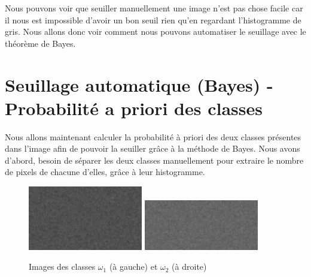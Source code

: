 \documentclass[a4paper,11pt]{article}
\begin{document}
  
  Nous pouvons voir que seuiller manuellement une image n'est pas chose facile car il nous
  est impossible d'avoir un bon seuil rien qu'en regardant l'histogramme de gris.
  Nous allons donc voir comment nous pouvons automatiser le seuillage avec le théorème
  de Bayes.
  
  \section{Seuillage automatique (Bayes) - Probabilité a priori des classes}
  Nous allons maintenant calculer la probabilité à priori des deux classes présentes dans l'image
  afin de pouvoir la seuiller grâce à la méthode de Bayes. Nous avons d'abord, besoin de séparer
  les deux classes manuellement pour extraire le nombre de pixels de chacune d'elles, grâce à leur 
  histogramme.\\
  
  \begin{figure}[H]
    \center
    \includegraphics[width=5cm]{2classes_100_100_8bits_omega1.png}
    \includegraphics[width=5cm]{2classes_100_100_8bits_omega2.png}
    \caption{Images des classes $\omega_{1}$ (à gauche) et $\omega_{2}$ (à droite)}
  \end{figure}
  
\end{document}
